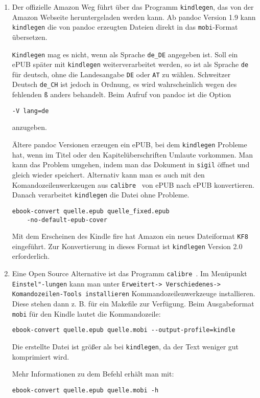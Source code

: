 \documentclass[11pt,ngerman,a4paper]{article}
\begin{document}
\begin{enumerate}
\def\labelenumi{\arabic{enumi}.}
\item
  Der offizielle Amazon Weg führt über das Programm \texttt{kindlegen},
  das von der Amazon Webseite heruntergeladen werden kann. Ab pandoc
  Version 1.9 kann \texttt{kindlegen} die von pandoc erzeugten Dateien
  direkt in das \texttt{mobi}-Format übersetzen.

  \texttt{Kindlegen} mag es nicht, wenn als Sprache \texttt{de\_DE}
  angegeben ist. Soll ein ePUB später mit \texttt{kindlegen}
  weiterverarbeitet werden, so ist als Sprache \texttt{de} für deutsch,
  ohne die Landesangabe \texttt{DE} oder \texttt{AT} zu wählen.
  Schweitzer Deutsch \texttt{de\_CH} ist jedoch in Ordnung, es wird
  wahrscheinlich wegen des fehlenden \texttt{ß} anders behandelt. Beim
  Aufruf von pandoc ist die Option

\begin{verbatim}
-V lang=de
\end{verbatim}

  anzugeben.

  Ältere pandoc Versionen erzeugen ein ePUB, bei dem \texttt{kindlegen}
  Probleme hat, wenn im Titel oder den Kapitelüberschriften Umlaute
  vorkommen. Man kann das Problem umgehen, indem man das Dokument in
  \texttt{sigil} öffnet und gleich wieder speichert. Alternativ kann man
  es auch mit den Komandozeilenwerkzeugen aus
  \texttt{calibre}~\autocite{calibre} von ePUB nach ePUB konvertieren.
  Danach verarbeitet \texttt{kindlegen} die Datei ohne Probleme.

\begin{verbatim}
ebook-convert quelle.epub quelle_fixed.epub 
    -no-default-epub-cover
\end{verbatim}

  Mit dem Erscheinen des Kindle fire hat Amazon ein neues Dateiformat
  \texttt{KF8} eingeführt. Zur Konvertierung in dieses Format ist
  \texttt{kindlegen} Version 2.0 erforderlich.
\item
  Eine Open Source Alternative ist das Programm
  \texttt{calibre}~\autocite{calibre}. Im Menüpunkt
  \texttt{Einstel"-lungen} kann man unter
  \texttt{Erweitert-\textgreater{} Verschiedenes-\textgreater{} Komandozeilen-Tools installieren}
  Kommandozeilenwerkzeuge installieren. Diese stehen dann z. B. für ein
  Makefile zur Verfügung. Beim Ausgabeformat \texttt{mobi} für den
  Kindle lautet die Kommandozeile:

\begin{verbatim}
ebook-convert quelle.epub quelle.mobi --output-profile=kindle 
\end{verbatim}

  Die erstellte Datei ist größer als bei \texttt{kindlegen}, da der Text
  weniger gut komprimiert wird.

  Mehr Informationen zu dem Befehl erhält man mit:

\begin{verbatim}
ebook-convert quelle.epub quelle.mobi -h 
\end{verbatim}
\end{enumerate}
\end{document}
